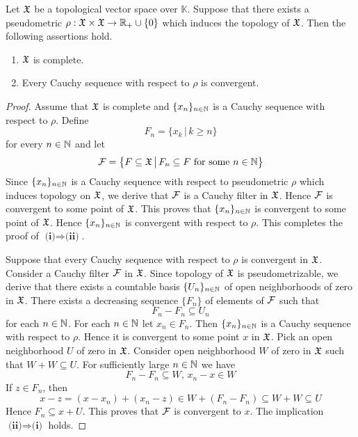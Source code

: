 \begin{theorem}\label{theorem:pseudometrizability_completeness_is_determined_by_Cauchy_sequences}
   Let ${\mathfrak X}$ be a topological vector space over $\mathbb{K}$. Suppose that there exists a pseudometric $\rho:{\mathfrak X}\times {\mathfrak X} \rightarrow {\mathbb R}_+\cup \{0\}$ which induces the topology of ${\mathfrak X}$. Then the following assertions hold.
   \begin{enumerate}[label=\emph{\textbf{(\roman*)}}, leftmargin=*]
      \item ${\mathfrak X}$ is complete.
      \item Every Cauchy sequence with respect to $\rho$ is convergent.
   \end{enumerate}
\end{theorem}
\begin{proof}
   Assume that ${\mathfrak X}$ is complete and $\{x_n\}_{n\in {\mathbb N}}$ is a Cauchy sequence with respect to $\rho$. Define
   $$F_n = \big\{x_k\,\big|\,k\geq n\big\}$$
   for every $n\in {\mathbb N}$ and let
   $${\mathcal F} = \big\{F\subseteq {\mathfrak X}\,\big|\,F_n \subseteq F\mbox{ for some }n\in {\mathbb N}\big\}$$
   Since $\{x_n\}_{n\in {\mathbb N}}$ is a Cauchy sequence with respect to pseudometric $\rho$ which induces topology on ${\mathfrak X}$, we derive that ${\mathcal F}$ is a Cauchy filter in ${\mathfrak X}$. Hence ${\mathcal F}$ is convergent to some point of ${\mathfrak X}$. This proves that $\{x_n\}_{n\in {\mathbb N}}$ is convergent to some point of ${\mathfrak X}$. Hence $\{x_n\}_{n\in {\mathbb N}}$ is convergent with respect to $\rho$. This completes the proof of $\textbf{(i)}\Rightarrow \textbf{(ii)}$.

   Suppose that every Cauchy sequence with respect to $\rho$ is convergent in ${\mathfrak X}$. Consider a Cauchy filter ${\mathcal F}$ in ${\mathfrak X}$. Since topology of ${\mathfrak X}$ is pseudometrizable, we derive that there exists a countable basis $\{U_n\}_{n\in {\mathbb N}}$ of open neighborhoods of zero in ${\mathfrak X}$. There exists a decreasing sequence $\{F_n\}$ of elements of ${\mathcal F}$ such that
   $$F_n - F_n\subseteq U_n$$
   for each $n\in {\mathbb N}$. For each $n\in {\mathbb N}$ let $x_n \in F_n$. Then $\{x_n\}_{n\in {\mathbb N}}$ is a Cauchy sequence with respect to $\rho$. Hence it is convergent to some point $x$ in ${\mathfrak X}$. Pick an open neighborhood $U$ of zero in ${\mathfrak X}$. Consider open neighborhood $W$ of zero in ${\mathfrak X}$ such that $W + W \subseteq U$. For sufficiently large $n\in {\mathbb N}$ we have
   $$F_n - F_n \subseteq W,\,x_n - x \in W$$
   If $z \in F_n$, then
   $$x - z = (x - x_n) + (x_n - z) \in W + (F_n - F_n) \subseteq W + W \subseteq U$$
   Hence $F_n \subseteq x + U$. This proves that ${\mathcal F}$ is convergent to $x$. The implication $\textbf{(ii)}\Rightarrow \textbf{(i)}$ holds.
\end{proof}

